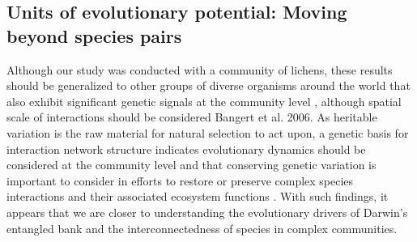 \documentclass[9pt,twocolumn,twoside,lineno]{pnas-new}
\begin{document}
\subsection{Units of evolutionary potential: Moving beyond species pairs}


Although our study was conducted with a community of lichens, these
results should be generalized to other groups of diverse organisms
around the world that also exhibit significant genetic signals at the
community level \cite{Rowntree2011, Whitham2012}, although spatial
scale of interactions should be considered \cite{Zook2010} Bangert et
al. 2006. As heritable variation is the raw material for natural
selection to act upon, a genetic basis for interaction network
structure indicates evolutionary dynamics should be considered at the
community level and that conserving genetic variation is important to
consider in efforts to restore or preserve complex species
interactions and their associated ecosystem functions
\cite{Evans2013}.  With such findings, it appears that we are closer
to understanding the evolutionary drivers of Darwin's entangled bank
and the interconnectedness of species in complex communities.



\showacknow{} %


\end{document}
